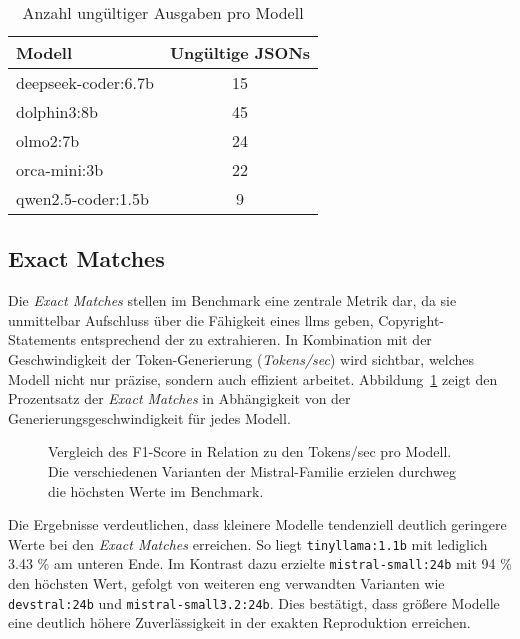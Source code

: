 \begin{table}[H]
    \centering
    \begin{tabular}{l c}
        \toprule
        \textbf{Modell} & \textbf{Ungültige JSONs} \\
        \midrule
        deepseek-coder:6.7b     & 15 \\
        dolphin3:8b             & 45 \\
        olmo2:7b                & 24 \\
        orca-mini:3b            & 22 \\
        qwen2.5-coder:1.5b      & 9  \\
        \bottomrule
    \end{tabular}
    \caption{Anzahl ungültiger Ausgaben pro Modell}
    \label{tab:model-invalid-jsons}
\end{table}


\subsection{Exact Matches}

Die \textit{Exact Matches} stellen im Benchmark eine zentrale Metrik dar, da sie unmittelbar Aufschluss über die Fähigkeit eines \glspl{llm} geben, Copyright-Statements entsprechend der  zu extrahieren.
In Kombination mit der Geschwindigkeit der Token-Generierung (\textit{Tokens/sec}) wird sichtbar, welches Modell nicht nur präzise, sondern auch effizient arbeitet.
Abbildung~\ref{fig:exact-matches-overall-result} zeigt den Prozentsatz der \textit{Exact Matches} in Abhängigkeit von der Generierungsgeschwindigkeit für jedes Modell.

\begin{figure}[ht]
    \centering
    \caption{Vergleich des F1-Score in Relation zu den Tokens/sec pro Modell. Die verschiedenen Varianten der Mistral-Familie erzielen durchweg die höchsten Werte im Benchmark.}
    \label{fig:exact-matches-overall-result}
\end{figure}

Die Ergebnisse verdeutlichen, dass kleinere Modelle tendenziell deutlich geringere Werte bei den \textit{Exact Matches} erreichen.
So liegt \texttt{tinyllama:1.1b} mit lediglich \num{3.43} \% am unteren Ende.
Im Kontrast dazu erzielte \texttt{mistral-small:24b} mit \num{94} \% den höchsten Wert, gefolgt von weiteren eng verwandten Varianten wie \texttt{devstral:24b} und \texttt{mistral-small3.2:24b}.
Dies bestätigt, dass größere Modelle eine deutlich höhere Zuverlässigkeit in der exakten Reproduktion erreichen.

